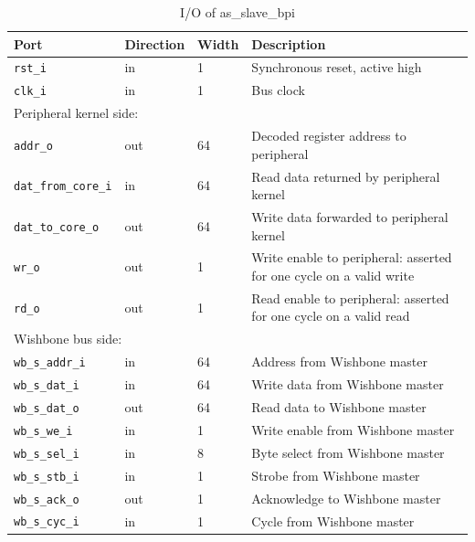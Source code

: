 \begin{table}[H]
\caption{I/O of as\_slave\_bpi}
\label{tab:asSlaveBpiIO}
\centering
\begin{tabularx}{\textwidth}{|l |l |l |X|}
  \hline
  Port & Direction & Width & Description \\
  \hline
  \hline
  \texttt{rst\_i}            & in  & 1  & Synchronous reset, active high \\
  \hline
  \texttt{clk\_i}            & in  & 1  & Bus clock \\
  \hline
  \multicolumn{4}{|l|}{Peripheral kernel side:} \\
  \hline
  \texttt{addr\_o}           & out & 64 & Decoded register address to peripheral \\
  \hline
  \texttt{dat\_from\_core\_i}& in  & 64 & Read data returned by peripheral kernel \\
  \hline
  \texttt{dat\_to\_core\_o}  & out & 64 & Write data forwarded to peripheral kernel \\
  \hline
  \texttt{wr\_o}             & out & 1  & Write enable to peripheral: asserted for one cycle on a valid write \\
  \hline
  \texttt{rd\_o}             & out & 1  & Read enable to peripheral: asserted for one cycle on a valid read \\
  \hline
  \multicolumn{4}{|l|}{Wishbone bus side:} \\
  \hline
  \texttt{wb\_s\_addr\_i}    & in  & 64 & Address from Wishbone master \\
  \hline
  \texttt{wb\_s\_dat\_i}     & in  & 64 & Write data from Wishbone master \\
  \hline
  \texttt{wb\_s\_dat\_o}     & out & 64 & Read data to Wishbone master \\
  \hline
  \texttt{wb\_s\_we\_i}      & in  & 1  & Write enable from Wishbone master \\
  \hline
  \texttt{wb\_s\_sel\_i}     & in  & 8  & Byte select from Wishbone master \\
  \hline
  \texttt{wb\_s\_stb\_i}     & in  & 1  & Strobe from Wishbone master \\
  \hline
  \texttt{wb\_s\_ack\_o}     & out & 1  & Acknowledge to Wishbone master \\
  \hline
  \texttt{wb\_s\_cyc\_i}     & in  & 1  & Cycle from Wishbone master \\
  \hline
\end{tabularx}
\end{table}

